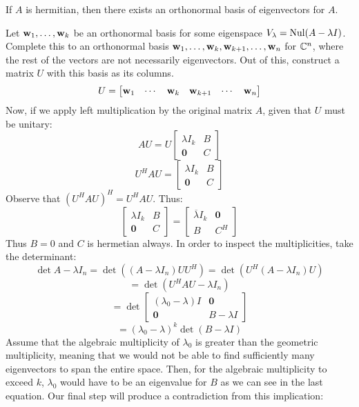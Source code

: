 \documentclass{article}
\begin{document}
    \begin{theorem}
        If $A$ is hermitian, then there exists an orthonormal basis of eigenvectors for $A$.
    \end{theorem}
    \pf
    Let $\mathbf{w}_1, \ldots, \mathbf{w}_k$ be an orthonormal basis for some eigenspace $V_\lambda = \operatorname{Nul}(A-\lambda I)$. Complete this to an orthonormal basis $\mathbf{w}_1, \ldots, \mathbf{w}_k, \mathbf{w}_{k+1}, \ldots, \mathbf{w}_n$ for $\mathbb{C}^n$, where the rest of the vectors are not necessarily eigenvectors. Out of this, construct a matrix $U$ with this basis as its columns.
    \[U = \begin{bmatrix}
        \mathbf{w}_1 & \cdots & \mathbf{w}_k & \mathbf{w}_{k+1} & \cdots & \mathbf{w}_n
    \end{bmatrix}\]
    Now, if we apply left multiplication by the original matrix $A$, given that $U$ must be unitary:
    \[AU = U\begin{bmatrix}
        \lambda I_k & B \\
        \mathbf{0} & C
    \end{bmatrix}\]
    \[U^H AU = \begin{bmatrix}
        \lambda I_k & B \\
        \mathbf{0} & C
    \end{bmatrix}\]
    Observe that $(U^H AU)^H = U^H AU$. Thus:
    \[\begin{bmatrix}
        \lambda I_k & B \\
        \mathbf{0} & C
    \end{bmatrix} = \begin{bmatrix}
        \overline{\lambda} I_k & \mathbf{0} \\
        B & C^H
    \end{bmatrix}\] 
    Thus $B = 0$ and $C$ is hermetian always. In order to inspect the multiplicities, take the determinant:
    \[\det{A - \lambda I_n} = \det({(A-\lambda I_n) U U^H}) = \det(U^H(A - \lambda I_n)U)\]
    \[= \det(U^H AU - \lambda I_n)\]
    \[= \det \begin{bmatrix}
        (\lambda_0 - \lambda) I & \mathbf{0} \\
        \mathbf{0} & B - \lambda I 
    \end{bmatrix}\]
    \[=(\lambda_0 - \lambda)^k \det(B-\lambda I)\]
    Assume that the algebraic multiplicity of $\lambda_0$ is greater than the geometric multiplicity, meaning that we would not be able to find sufficiently many eigenvectors to span the entire space. Then, for the algebraic multiplicity to exceed $k$, $\lambda_0$ would have to be an eigenvalue for $B$ as we can see in the last equation. Our final step will produce a contradiction from this implication:
\end{document}
